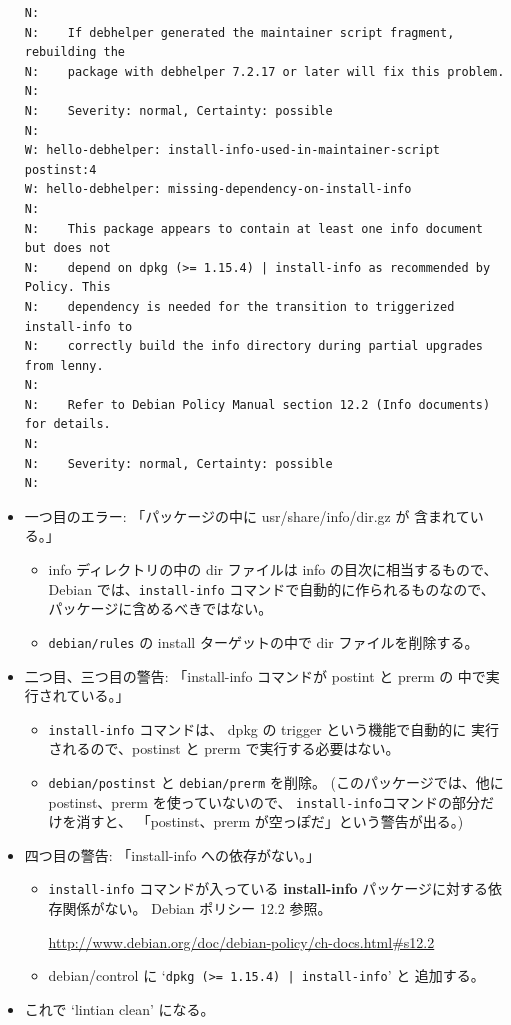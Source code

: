 \documentclass[mingoth,a4paper]{jsarticle}
\begin{document}
\begin{itemize}
\begin{screen}[5]
{\begin{verbatim}
N:    
N:    If debhelper generated the maintainer script fragment, rebuilding the
N:    package with debhelper 7.2.17 or later will fix this problem.
N:    
N:    Severity: normal, Certainty: possible
N: 
W: hello-debhelper: install-info-used-in-maintainer-script postinst:4
W: hello-debhelper: missing-dependency-on-install-info
N: 
N:    This package appears to contain at least one info document but does not
N:    depend on dpkg (>= 1.15.4) | install-info as recommended by Policy. This
N:    dependency is needed for the transition to triggerized install-info to
N:    correctly build the info directory during partial upgrades from lenny.
N:    
N:    Refer to Debian Policy Manual section 12.2 (Info documents) for details.
N:    
N:    Severity: normal, Certainty: possible
N: 
\end{verbatim}
    }
  \end{screen}
\item 一つ目のエラー: 「パッケージの中に usr/share/info/dir.gz が
  含まれている。」
  \begin{itemize}
  \item info ディレクトリの中の dir ファイルは info の目次に相当するもので、
    Debian では、\texttt{install-info} コマンドで自動的に作られるものなので、
    パッケージに含めるべきではない。
  \item \texttt{debian/rules} の install ターゲットの中で
    dir ファイルを削除する。
  \end{itemize}
\item 二つ目、三つ目の警告: 「install-info コマンドが postint と prerm の
  中で実行されている。」
  \begin{itemize}
  \item \texttt{install-info} コマンドは、
    dpkg の trigger という機能で自動的に
    実行されるので、postinst と prerm で実行する必要はない。
  \item \texttt{debian/postinst} と \texttt{debian/prerm} を削除。
    (このパッケージでは、他に postinst、prerm を使っていないので、
    \texttt{install-info}コマンドの部分だけを消すと、
    「postinst、prerm が空っぽだ」という警告が出る。)
  \end{itemize}
\item 四つ目の警告: 「install-info への依存がない。」
  \begin{itemize}
  \item \texttt{install-info} コマンドが入っている
    \textbf{install-info} パッケージに対する依存関係がない。
    Debian ポリシー 12.2 参照。

    \url{http://www.debian.org/doc/debian-policy/ch-docs.html#s12.2}
  \item debian/control に `\verb:dpkg (>= 1.15.4) | install-info:' と
    追加する。
  \end{itemize}
\item これで `lintian clean' になる。
\end{itemize}
\end{document}
